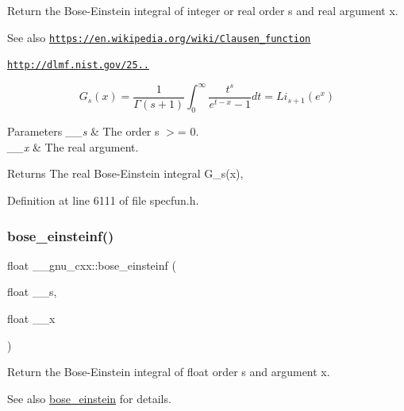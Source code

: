 Return the Bose-\/\+Einstein integral of integer or real order s and real argument x. \begin{DoxySeeAlso}{See also}
\href{https://en.wikipedia.org/wiki/Clausen_function}{\tt https\+://en.\+wikipedia.\+org/wiki/\+Clausen\+\_\+function} 

\href{http://dlmf.nist.gov/25.12.16}{\tt http\+://dlmf.\+nist.\+gov/25..}
\end{DoxySeeAlso}
\[ G_s(x) = \frac{1}{\Gamma(s+1)}\int_0^\infty \frac{t^s}{e^{t-x} - 1}dt = Li_{s+1}(e^x) \]


\begin{DoxyParams}{Parameters}
{\em \+\_\+\+\_\+s} & The order s $>$= 0. \\
\hline
{\em \+\_\+\+\_\+x} & The real argument. \\
\hline
\end{DoxyParams}
\begin{DoxyReturn}{Returns}
The real Bose-\/\+Einstein integral G\+\_\+s(x), 
\end{DoxyReturn}


Definition at line 6111 of file specfun.\+h.

\mbox{\label{group__gnu__math__spec__func_gac1fb313fba5639d4168b6ee682507688}} 
\subsubsection{\texorpdfstring{bose\+\_\+einsteinf()}{bose\_einsteinf()}}
{\footnotesize\ttfamily float \+\_\+\+\_\+gnu\+\_\+cxx\+::bose\+\_\+einsteinf (\begin{DoxyParamCaption}\item[{float}]{\+\_\+\+\_\+s,  }\item[{float}]{\+\_\+\+\_\+x }\end{DoxyParamCaption})\hspace{0.3cm}{\ttfamily [inline]}}

Return the Bose-\/\+Einstein integral of {\ttfamily float} order s and argument x.

\begin{DoxySeeAlso}{See also}
\hyperlink{group__gnu__math__spec__func_gae8135b6861a48f2cee2e692093a17102}{bose\+\_\+einstein} for details. 
\end{DoxySeeAlso}


